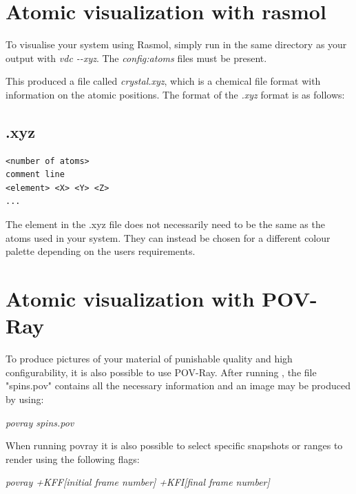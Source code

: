 \section*{Atomic visualization with rasmol}

To visualise your system using Rasmol, simply run \vdc in the same directory as your output with \textit{vdc -{}-xyz}. The \textit{config:atoms} files must be present.

This produced a file called \textit{crystal.xyz}, which is a chemical file format with information on the atomic positions. The format of the \textit{.xyz} format is as follows:

\subsection*{.xyz}
{\footnotesize
\begin{verbatim}
<number of atoms>
comment line
<element> <X> <Y> <Z>
...
\end{verbatim}
}

The element in the .xyz file does not necessarily need to be the same as the atoms used in your system. They can instead be chosen for a different colour palette depending on the users requirements.

\section*{Atomic visualization with POV-Ray}

To produce pictures of your material of punishable quality and high configurability, it is also possible to use POV-Ray. After running \vdc, the file "spins.pov" contains all the necessary information and an image may be produced by using:

\noindent
\begin{minipage}[c]{\textwidth}
\centering
\textit{povray spins.pov}
\end{minipage}

When running povray it is also possible to select specific snapshots or ranges to render using the following flags:

\noindent
\begin{minipage}[c]{\textwidth}
\centering
\textit{povray +KFF[initial frame number] +KFI[final frame number]}
\end{minipage}

